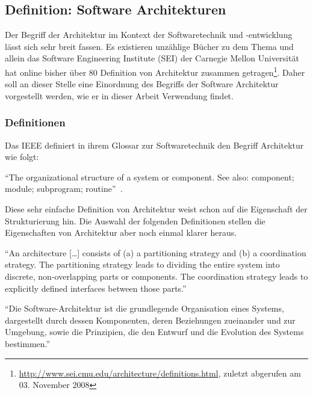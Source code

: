 \subsection{Definition: Software Architekturen} %
\label{sub:definition_software_architekturen}

  Der Begriff der Architektur im Kontext der Softwaretechnik und -entwicklung lässt sich sehr breit fassen. Es existieren unzählige Bücher zu dem Thema und allein das Software Engineering Institute (SEI) der Carnegie Mellon Universität hat online bisher über 80 Definition von Architektur zusammen getragen\footnote{\url{http://www.sei.cmu.edu/architecture/definitions.html}, zuletzt abgerufen am 03. November 2008}. Daher soll an dieser Stelle eine Einordnung des Begriffs der Software Architektur vorgestellt werden, wie er in dieser Arbeit Verwendung findet.
  
\subsubsection{Definitionen} %
\label{ssub:definitionen}

  Das IEEE definiert in ihrem Glossar zur Softwaretechnik den Begriff Architektur wie folgt:
  
  \begin{definition}\label{def:architektur_ieee}
    "`The organizational structure of a system or component. See also: component; module; subprogram; routine"'~\emph{\citep{ieee90sg}.}
  \end{definition}
  
  Diese sehr einfache Definition von Architektur weist schon auf die Eigenschaft der Strukturierung hin. Die Auswahl der folgenden Definitionen stellen die Eigenschaften von Architektur aber noch einmal klarer heraus.
  
  \begin{definition}\label{def:architektur_crispen}
    "`An architecture [\ldots] consists of (a) a partitioning strategy and (b) a coordination strategy. The partitioning strategy leads to dividing the entire system into discrete, non-overlapping parts or components. The coordination strategy leads to explicitly defined interfaces between those parts."'~\emph{\citep[S. 272]{crispen1994sm}}
  \end{definition}
  
  \begin{definition}\label{def:architektur_reussner_et_al}
    "`Die Software-Architektur ist die grundlegende Organisation eines Systems, dargestellt durch dessen Komponenten, deren Beziehungen zueinander und zur Umgebung, sowie die Prinzipien, die den Entwurf und die Evolution des Systems bestimmen."'~\emph{\citep[S. 1]{handbuch_der_software_architektur}}
  \end{definition}
  
